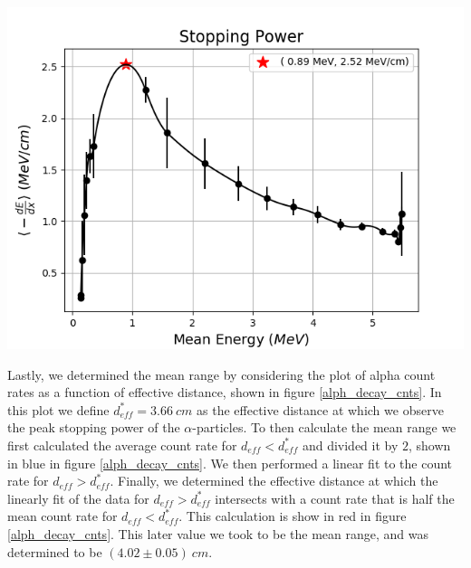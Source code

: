 \documentclass[10pt]{article}
\newenvironment{Figure}
{\par\medskip\noindent\minipage{\linewidth}}
{\endminipage\par\medskip}
\begin{document}
\begin{multicols}{2}
\begin{Figure}
	\includegraphics[width=\textwidth,keepaspectratio]{stop_pwr.png}
\end{Figure} 

Lastly, we determined the mean range by considering the plot of alpha count rates as a function of effective distance, shown in figure \ref{alph_decay_cnts}.  In this plot we define $d_{eff}^{*} = 3.66 \ cm$ as the effective distance at which we observe the peak stopping power of the $\alpha$-particles.  To then calculate the mean range we first calculated the average count rate for $d_{eff} < d_{eff}^{*}$ and divided it by $2$, shown in blue in figure \ref{alph_decay_cnts}.  We then performed a linear fit to the count rate for $d_{eff} > d_{eff}^{*}$.  Finally, we determined the effective distance at which the linearly fit  of the data for $d_{eff} > d_{eff}^{*}$ intersects with a count rate that is half the mean count rate for $d_{eff} < d_{eff}^{*}$.  This calculation is show in red in figure \ref{alph_decay_cnts}.  This later value we took to be the mean range, and was determined to be $(4.02 \pm 0.05 ) \ cm$.


\end{multicols}
\end{document}
